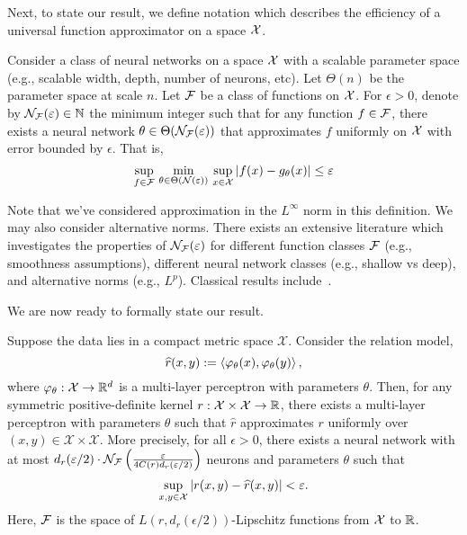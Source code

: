 Next, to state our result, we define notation which describes the efficiency of a universal function approximator on a space ${\mathcal{X}}$.
\begin{definition}\label{def:univ_approx_efficiency}
	Consider a class of neural networks on a space ${\mathcal{X}}$ with a scalable parameter space (e.g., scalable width, depth, number of neurons, etc). Let $\Theta(n)$ be the parameter space at scale $n$. Let ${\mathcal{F}}$ be a class of functions on ${\mathcal{X}}$. For $\epsilon > 0$, denote by ${\mathcal{N}}_{\mathcal{F}}(\varepsilon) \in \mathbb{N}$ the minimum integer such that for any function $f \in {\mathcal{F}}$, there exists a neural network $\theta \in \Theta({\mathcal{N}}_{\mathcal{F}}(\varepsilon))$ that approximates $f$ uniformly on ${\mathcal{X}}$ with error bounded by $\epsilon$. That is,
	\begin{equation*}
		\sup_{f \in \calF} \, \min_{\theta \in \Theta(\calN(\epsilon))} \,  \sup_{x \in \calX} \abs{f(x) - g_\theta(x)} \leq \epsilon
	\end{equation*}
\end{definition}

Note that we've considered approximation in the $L^\infty$ norm in this definition. We may also consider alternative norms. There exists an extensive literature which investigates the properties of ${\mathcal{N}}_{\mathcal{F}}(\varepsilon)$ for different function classes ${\mathcal{F}}$ (e.g., smoothness assumptions), different neural network classes (e.g., shallow vs deep), and alternative norms (e.g., $L^p$). Classical results include~\parencite{cybenkoApproximationSuperpositions1989,barronUniversalApproximation1993,hornikMultilayerFeedforward1989}.

We are now ready to formally state our result.

\begin{theorem}\label{theorem:symmetric_inner_prod_rels_func_class}
	\hphantom{~}

	Suppose the data lies in a compact metric space $\mathcal{X}$. Consider the relation model,
	\begin{equation*}
		\hat{r}(x, y) := \iprod{\phi_{\theta}(x)}{\phi_{\theta}(y)},
	\end{equation*}
	where $\varphi_{\theta}: {\mathcal{X}} \to \mathbb{R}^d$ is a multi-layer perceptron with parameters $\theta$. %
	Then, for any symmetric positive-definite kernel $r: {\mathcal{X}} \times {\mathcal{X}} \to \mathbb{R}$, there exists a multi-layer perceptron with parameters $\theta$ such that $\hat{r}$ approximates $r$ uniformly over $(x,y) \in \mathcal{X}\times\mathcal{X}$. More precisely, for all $\epsilon > 0$, there exists a neural network with at most $d_r(\varepsilon / 2) \cdot {\mathcal{N}}_{\mathcal{F}}\left(\frac{\varepsilon}{4 C(r) d_r(\varepsilon / 2)}\right)$ neurons and parameters $\theta$ such that
    \[\sup_{x,y \in \mathcal{X}}{\left\lvert r(x,y) - \widehat{r}(x,y)\right\rvert} < \varepsilon.\]
	Here, ${\mathcal{F}}$ is the space of $L(r, d_r(\epsilon/2))$-Lipschitz functions from ${\mathcal{X}}$ to $\mathbb{R}$.
\end{theorem}

